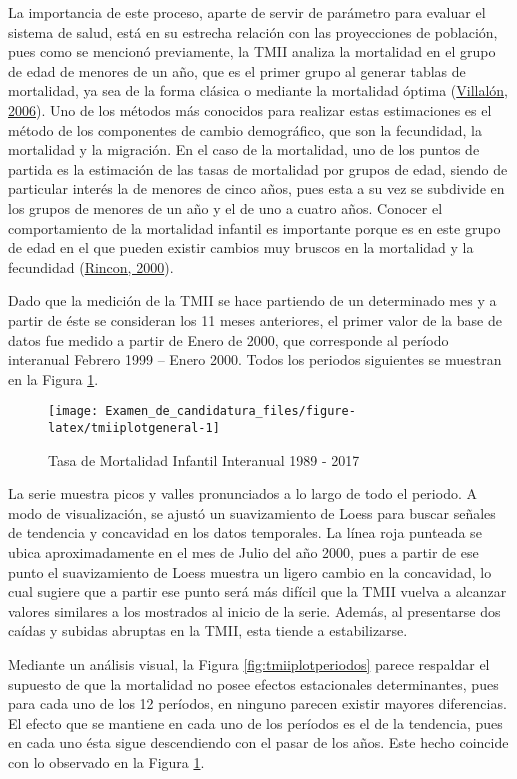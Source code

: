 \documentclass[
]{article}
\begin{document}
La importancia de este proceso, aparte de servir de parámetro para
evaluar el sistema de salud, está en su estrecha relación con las
proyecciones de población, pues como se mencionó previamente, la TMII
analiza la mortalidad en el grupo de edad de menores de un año, que es
el primer grupo al generar tablas de mortalidad, ya sea de la forma
clásica o mediante la mortalidad óptima
(\protect\hyperlink{ref-mortalidad_optima}{Villalón, 2006}). Uno de los
métodos más conocidos para realizar estas estimaciones es el método de
los componentes de cambio demográfico, que son la fecundidad, la
mortalidad y la migración. En el caso de la mortalidad, uno de los
puntos de partida es la estimación de las tasas de mortalidad por grupos
de edad, siendo de particular interés la de menores de cinco años, pues
esta a su vez se subdivide en los grupos de menores de un año y el de
uno a cuatro años. Conocer el comportamiento de la mortalidad infantil
es importante porque es en este grupo de edad en el que pueden existir
cambios muy bruscos en la mortalidad y la fecundidad
(\protect\hyperlink{ref-Rincon}{Rincon, 2000}).

Dado que la medición de la TMII se hace partiendo de un determinado mes
y a partir de éste se consideran los 11 meses anteriores, el primer
valor de la base de datos fue medido a partir de Enero de 2000, que
corresponde al período interanual Febrero 1999 -- Enero 2000. Todos los
periodos siguientes se muestran en la Figura \ref{fig:tmiiplotgeneral}.

\begin{figure}[H]
\texttt{[image: Examen\_de\_candidatura\_files/figure-latex/tmiiplotgeneral-1]} \caption{Tasa de Mortalidad Infantil Interanual 1989 - 2017}\label{fig:tmiiplotgeneral}
\end{figure}

La serie muestra picos y valles pronunciados a lo largo de todo el
periodo. A modo de visualización, se ajustó un suavizamiento de Loess
para buscar señales de tendencia y concavidad en los datos temporales.
La línea roja punteada se ubica aproximadamente en el mes de Julio del
año 2000, pues a partir de ese punto el suavizamiento de Loess muestra
un ligero cambio en la concavidad, lo cual sugiere que a partir ese
punto será más difícil que la TMII vuelva a alcanzar valores similares a
los mostrados al inicio de la serie. Además, al presentarse dos caídas y
subidas abruptas en la TMII, esta tiende a estabilizarse.

Mediante un análisis visual, la Figura \ref{fig:tmiiplotperiodos} parece
respaldar el supuesto de que la mortalidad no posee efectos estacionales
determinantes, pues para cada uno de los 12 períodos, en ninguno parecen
existir mayores diferencias. El efecto que se mantiene en cada uno de
los períodos es el de la tendencia, pues en cada uno ésta sigue
descendiendo con el pasar de los años. Este hecho coincide con lo
observado en la Figura \ref{fig:tmiiplotgeneral}.
\end{document}
